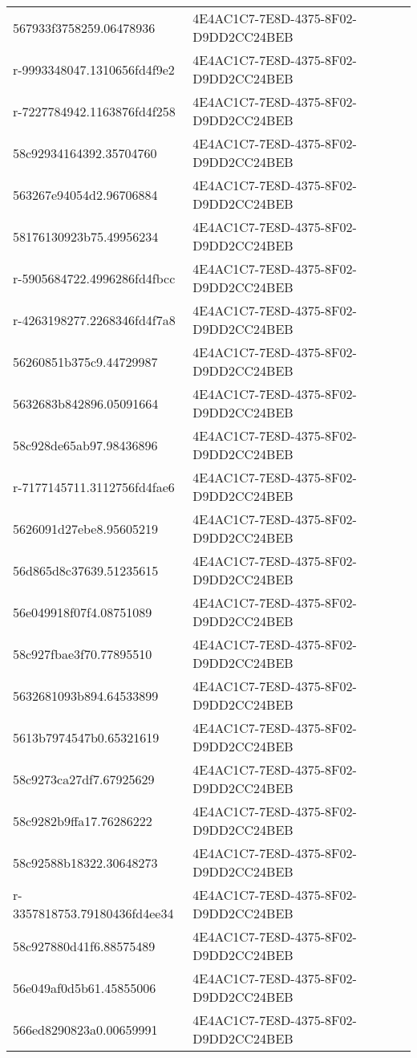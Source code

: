 \begin{tabular}{ll}
567933f3758259.06478936 & 4E4AC1C7-7E8D-4375-8F02-D9DD2CC24BEB \\
r-9993348047.1310656fd4f9e2 & 4E4AC1C7-7E8D-4375-8F02-D9DD2CC24BEB \\
r-7227784942.1163876fd4f258 & 4E4AC1C7-7E8D-4375-8F02-D9DD2CC24BEB \\
58c92934164392.35704760 & 4E4AC1C7-7E8D-4375-8F02-D9DD2CC24BEB \\
563267e94054d2.96706884 & 4E4AC1C7-7E8D-4375-8F02-D9DD2CC24BEB \\
58176130923b75.49956234 & 4E4AC1C7-7E8D-4375-8F02-D9DD2CC24BEB \\
r-5905684722.4996286fd4fbcc & 4E4AC1C7-7E8D-4375-8F02-D9DD2CC24BEB \\
r-4263198277.2268346fd4f7a8 & 4E4AC1C7-7E8D-4375-8F02-D9DD2CC24BEB \\
56260851b375c9.44729987 & 4E4AC1C7-7E8D-4375-8F02-D9DD2CC24BEB \\
5632683b842896.05091664 & 4E4AC1C7-7E8D-4375-8F02-D9DD2CC24BEB \\
58c928de65ab97.98436896 & 4E4AC1C7-7E8D-4375-8F02-D9DD2CC24BEB \\
r-7177145711.3112756fd4fae6 & 4E4AC1C7-7E8D-4375-8F02-D9DD2CC24BEB \\
5626091d27ebe8.95605219 & 4E4AC1C7-7E8D-4375-8F02-D9DD2CC24BEB \\
56d865d8c37639.51235615 & 4E4AC1C7-7E8D-4375-8F02-D9DD2CC24BEB \\
56e049918f07f4.08751089 & 4E4AC1C7-7E8D-4375-8F02-D9DD2CC24BEB \\
58c927fbae3f70.77895510 & 4E4AC1C7-7E8D-4375-8F02-D9DD2CC24BEB \\
5632681093b894.64533899 & 4E4AC1C7-7E8D-4375-8F02-D9DD2CC24BEB \\
5613b7974547b0.65321619 & 4E4AC1C7-7E8D-4375-8F02-D9DD2CC24BEB \\
58c9273ca27df7.67925629 & 4E4AC1C7-7E8D-4375-8F02-D9DD2CC24BEB \\
58c9282b9ffa17.76286222 & 4E4AC1C7-7E8D-4375-8F02-D9DD2CC24BEB \\
58c92588b18322.30648273 & 4E4AC1C7-7E8D-4375-8F02-D9DD2CC24BEB \\
r-3357818753.79180436fd4ee34 & 4E4AC1C7-7E8D-4375-8F02-D9DD2CC24BEB \\
58c927880d41f6.88575489 & 4E4AC1C7-7E8D-4375-8F02-D9DD2CC24BEB \\
56e049af0d5b61.45855006 & 4E4AC1C7-7E8D-4375-8F02-D9DD2CC24BEB \\
566ed8290823a0.00659991 & 4E4AC1C7-7E8D-4375-8F02-D9DD2CC24BEB \\

\end{tabular}
